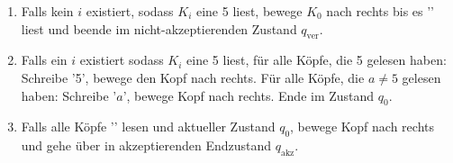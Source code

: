 \documentclass{article}
\begin{document}
\begin{enumerate}[1.]
	\item Falls kein $i$ existiert, sodass $K_i$ eine 5 liest, bewege $K_0$ nach rechts bis es '\textvisiblespace' liest und beende im nicht-akzeptierenden Zustand $q_\text{ver}$.
	
	\item Falls ein $i$ existiert sodass $K_i$ eine 5 liest, für alle Köpfe, die 5 gelesen haben: Schreibe '5', bewege den Kopf nach rechts. Für alle Köpfe, die $a \neq 5$ gelesen haben: Schreibe '$a$', bewege Kopf nach rechts. Ende im Zustand $q_0$.
	
	\item Falls alle Köpfe '\textvisiblespace' lesen und aktueller Zustand $q_0$, bewege Kopf nach rechts und gehe über in akzeptierenden Endzustand $q_\text{akz}$.
\end{enumerate}
\end{document}

